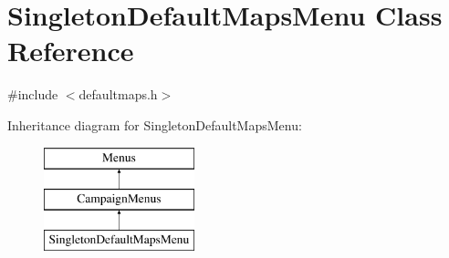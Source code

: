 \hypertarget{class_singleton_default_maps_menu}{}\section{Singleton\+Default\+Maps\+Menu Class Reference}
\label{class_singleton_default_maps_menu}


{\ttfamily \#include $<$defaultmaps.\+h$>$}

Inheritance diagram for Singleton\+Default\+Maps\+Menu\+:\begin{figure}[H]
\begin{center}
\leavevmode
\includegraphics[height=3.000000cm]{class_singleton_default_maps_menu}
\end{center}
\end{figure}
